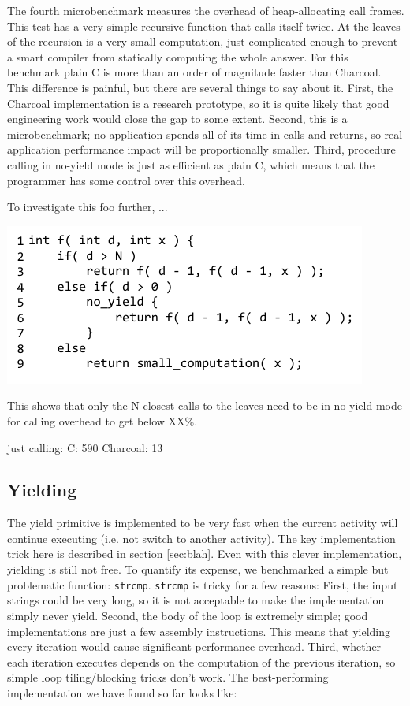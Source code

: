 \documentclass[10pt,preprint]{sigplanconf}
\begin{document}
The fourth microbenchmark measures the overhead of heap-allocating call frames.
This test has a very simple recursive function that calls itself twice.
At the leaves of the recursion is a very small computation, just complicated enough to prevent a smart compiler from statically computing the whole answer.
For this benchmark plain C is more than an order of magnitude faster than Charcoal.
This difference is painful, but there are several things to say about it.
First, the Charcoal implementation is a research prototype, so it is quite likely that good engineering work would close the gap to some extent.
Second, this is a microbenchmark; no application spends all of its time in calls and returns, so real application performance impact will be proportionally smaller.
Third, procedure calling in no-yield mode is just as efficient as plain C, which means that the programmer has some control over this overhead.

To investigate this foo further, ...

{\raggedleft \includegraphics{just_calling_n_benchmark}}

This shows that only the N closest calls to the leaves need to be in no-yield mode for calling overhead to get below XX\%.

just calling: C: 590  Charcoal: 13

\subsection{Yielding}

The yield primitive is implemented to be very fast when the current activity will continue executing (i.e. not switch to another activity).
The key implementation trick here is described in section \ref{sec:blah}.
Even with this clever implementation, yielding is still not free.
To quantify its expense, we benchmarked a simple but problematic function: \texttt{strcmp}.
\texttt{strcmp} is tricky for a few reasons:
First, the input strings could be very long, so it is not acceptable to make the implementation simply never yield.
Second, the body of the loop is extremely simple; good implementations are just a few assembly instructions.
This means that yielding every iteration would cause significant performance overhead.
Third, whether each iteration executes depends on the computation of the previous iteration, so simple loop tiling/blocking tricks don't work.
The best-performing implementation we have found so far looks like:
\end{document}
